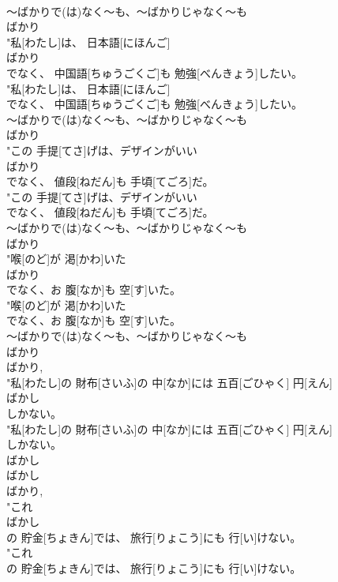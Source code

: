 \documentclass[8pt]{extreport}
\begin{document}
\begin{CJK}{UTF8}{min}
\\	～ばかりで(は)なく～も、～ばかりじゃなく～も	
\\	ばかり
\\	"私[わたし]は、 日本語[にほんご]
\\	ばかり
\\	でなく、 中国語[ちゅうごくご]も 勉強[べんきょう]したい。
\\	"私[わたし]は、 日本語[にほんご]
\\	でなく、 中国語[ちゅうごくご]も 勉強[べんきょう]したい。
\\	～ばかりで(は)なく～も、～ばかりじゃなく～も	
\\	ばかり
\\	"この 手提[てさ]げは、デザインがいい
\\	ばかり
\\	でなく、 値段[ねだん]も 手頃[てごろ]だ。
\\	"この 手提[てさ]げは、デザインがいい
\\	でなく、 値段[ねだん]も 手頃[てごろ]だ。
\\	～ばかりで(は)なく～も、～ばかりじゃなく～も	
\\	ばかり
\\	"喉[のど]が 渇[かわ]いた
\\	ばかり
\\	でなく、お 腹[なか]も 空[す]いた。
\\	"喉[のど]が 渇[かわ]いた
\\	でなく、お 腹[なか]も 空[す]いた。
\\	～ばかりで(は)なく～も、～ばかりじゃなく～も	
\\	ばかり
\\	ばかり, 
\\	"私[わたし]の 財布[さいふ]の 中[なか]には 五百[ごひゃく] 円[えん]
\\	ばかし
\\	しかない。
\\	"私[わたし]の 財布[さいふ]の 中[なか]には 五百[ごひゃく] 円[えん]
\\	しかない。
\\	ばかし 
\\	ばかし
\\	ばかり, 
\\	"これ
\\	ばかし
\\	の 貯金[ちょきん]では、 旅行[りょこう]にも 行[い]けない。
\\	"これ
\\	の 貯金[ちょきん]では、 旅行[りょこう]にも 行[い]けない。

\end{CJK}
\end{document}
